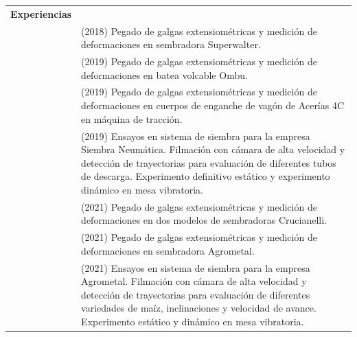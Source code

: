 \documentclass[a4paper,10pt, sans]{article}
\begin{document}
\begin{table}[H]
\begin{tabularx}{\textwidth}{r X}  
 \textbf{Experiencias} & {} \\ [1ex]
        {} & (2018) Pegado de galgas extensiométricas y medición de deformaciones en sembradora Superwalter. \\
        {} & (2019) Pegado de galgas extensiométricas y medición de deformaciones en batea volcable Ombu. \\
        {} & (2019) Pegado de galgas extensiométricas y medición de deformaciones en cuerpos de enganche de vagón de Acerías 4C en máquina de tracción. \\
        {} & (2019) Ensayos en sistema de siembra para la empresa Siembra Neumática. Filmación con cámara de alta velocidad y detección de trayectorias para evaluación de diferentes tubos de descarga. Experimento definitivo estático y experimento dinámico en mesa vibratoria.  \\
        {} & (2021) Pegado de galgas extensiométricas y medición de deformaciones en dos modelos de sembradoras Crucianelli. \\
        {} & (2021) Pegado de galgas extensiométricas y medición de deformaciones en sembradora Agrometal. \\
        {} & (2021) Ensayos en sistema de siembra para la empresa Agrometal. Filmación con cámara de alta velocidad y detección de trayectorias para evaluación de diferentes variedades de maíz, inclinaciones y velocidad de avance. Experimento estático y dinámico en mesa vibratoria. \\
\end{tabularx}
\end{table}
\end{document}
